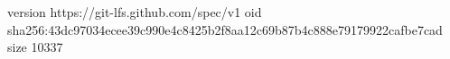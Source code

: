 version https://git-lfs.github.com/spec/v1
oid sha256:43dc97034ecee39c990e4c8425b2f8aa12c69b87b4c888e79179922cafbe7cad
size 10337
